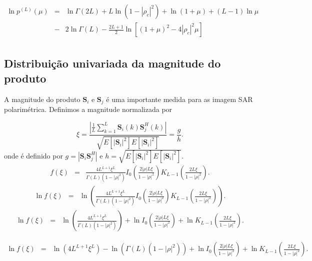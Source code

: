 \documentclass[journal,article,submit,moreauthors,pdftex]{Definitions/mdpi}
\begin{document}
\begin{equation}\label{eqn64}
\begin{array}{ccl}
	\ln p^{(L)}(\mu)&=&\ln\Gamma(2L) +L\ln(1-|\rho_c|^2)+\ln(1+\mu)+(L-1)\ln\mu\\
	&-&2\ln\Gamma(L)-\frac{2L+1}{2}\ln\left[(1+\mu)^2-4|\rho_c|^2\mu \right]\\
\end{array}
\end{equation}


\subsection{Distribuição univariada da magnitude do produto}
A magnitude do produto $\mathbf{S}_i$ e $\mathbf{S}_j$ é uma importante medida para as imagem SAR polarimétrica. Definimos a magnitude normalizada por 

\begin{equation}
	\xi = \frac{\left|\frac{1}{L} \sum_{k=1}^L\mathbf{S}_i(k)\mathbf{S}_j^H(k) \right|}{\sqrt{E[|\mathbf{S}_i|^2]E[|\mathbf{S}_i|^2]}}=\frac{g}{h}.
\end{equation}
onde é definido por $g=|\mathbf{S}_i\mathbf{S}_j^H|$ e $h=\sqrt{E[|\mathbf{S}_i|^2]E[|\mathbf{S}_i|^2]}$.
\begin{equation}
\begin{array}{ccc}
	f(\xi)&=&\frac{4L^{L+1}\xi^L}{\Gamma(L)(1-|\rho|^2)}I_0\left(\frac{2|\rho|L\xi}{1-|\rho|^2}\right)K_{L-1}\left(\frac{2L\xi}{1-|\rho|^2}\right).
		\end{array}
\end{equation}
\begin{equation}
\begin{array}{ccc}
	\ln f(\xi)&=&\ln\left(\frac{4L^{L+1}\xi^L}{\Gamma(L)(1-|\rho|^2)}I_0\left(\frac{2|\rho|L\xi}{1-|\rho|^2}\right)K_{L-1}\left(\frac{2L\xi}{1-|\rho|^2}\right)\right).
		\end{array}
\end{equation}
\begin{equation}
\begin{array}{ccc}
	\ln f(\xi)&=&\ln\left(\frac{4L^{L+1}\xi^L}{\Gamma(L)(1-|\rho|^2)}\right)+\ln I_0\left(\frac{2|\rho|L\xi}{1-|\rho|^2}\right)+ \ln K_{L-1}\left(\frac{2L\xi}{1-|\rho|^2}\right).
		\end{array}
\end{equation}

\begin{equation}
\begin{array}{ccc}
	\ln f(\xi)&=&\ln (4L^{L+1}\xi^L)-\ln(\Gamma(L)(1-|\rho|^2))+\ln I_0\left(\frac{2|\rho|L\xi}{1-|\rho|^2}\right)+ \ln K_{L-1}\left(\frac{2L\xi}{1-|\rho|^2}\right).
		\end{array}
\end{equation}
\end{document}
